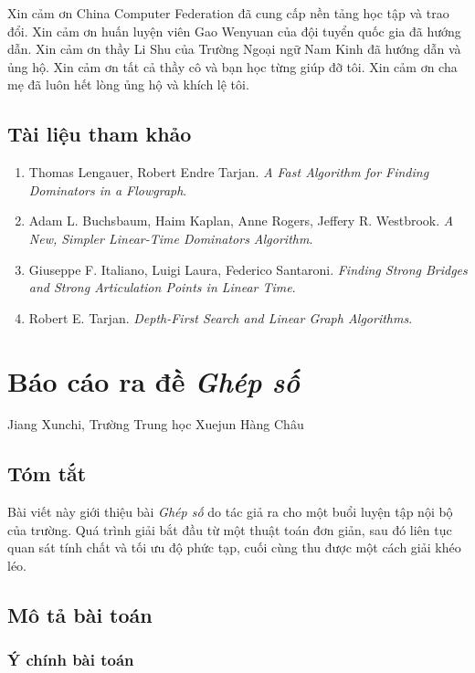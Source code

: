 \documentclass[11pt]{article}
\begin{document}
Xin cảm ơn China Computer Federation đã cung cấp nền tảng học tập và trao đổi.
Xin cảm ơn huấn luyện viên Gao Wenyuan của đội tuyển quốc gia đã hướng dẫn.
Xin cảm ơn thầy Li Shu của Trường Ngoại ngữ Nam Kinh đã hướng dẫn và ủng hộ.
Xin cảm ơn tất cả thầy cô và bạn học từng giúp đỡ tôi. Xin cảm ơn cha mẹ đã
luôn hết lòng ủng hộ và khích lệ tôi.

\subsection*{Tài liệu tham khảo}

\begin{enumerate}
  \item Thomas Lengauer, Robert Endre Tarjan. \emph{A Fast Algorithm for
  Finding Dominators in a Flowgraph}.
  \item Adam L. Buchsbaum, Haim Kaplan, Anne Rogers, Jeffery R. Westbrook.
  \emph{A New, Simpler Linear-Time Dominators Algorithm}.
  \item Giuseppe F. Italiano, Luigi Laura, Federico Santaroni. \emph{Finding
  Strong Bridges and Strong Articulation Points in Linear Time}.
  \item Robert E. Tarjan. \emph{Depth-First Search and Linear Graph
  Algorithms}.
\end{enumerate}

\section{Báo cáo ra đề \emph{Ghép số}}

\begin{center}
Jiang Xunchi, Trường Trung học Xuejun Hàng Châu
\end{center}

\subsection*{Tóm tắt}

Bài viết này giới thiệu bài \emph{Ghép số} do tác giả ra cho một buổi luyện
tập nội bộ của trường. Quá trình giải bắt đầu từ một thuật toán đơn giản, sau
đó liên tục quan sát tính chất và tối ưu độ phức tạp, cuối cùng thu được một
cách giải khéo léo.

\subsection{Mô tả bài toán}

\subsubsection{Ý chính bài toán}
\end{document}
